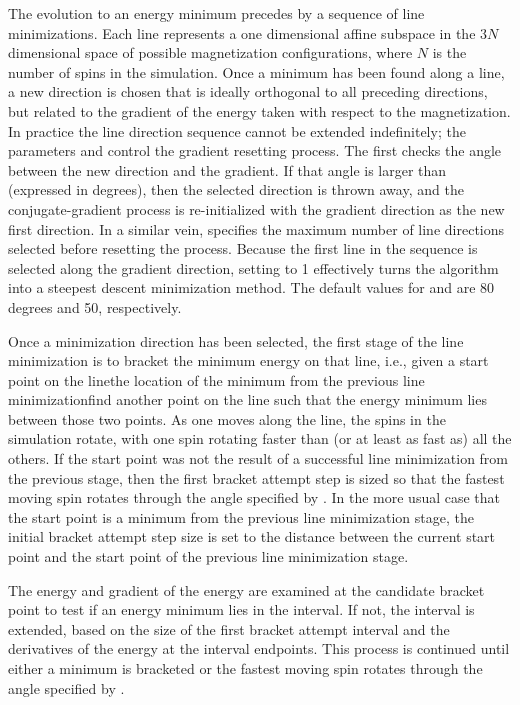 \begin{description}
The evolution to an energy minimum precedes by a sequence of line
minimizations.  Each line represents a one dimensional affine subspace
in the $3N$ dimensional space of possible magnetization configurations,
where $N$ is the number of spins in the simulation.  Once a minimum has
been found along a line, a new direction is chosen that is ideally
orthogonal to all preceding directions, but related to the gradient of
the energy taken with respect to the magnetization.  In practice the
line direction sequence cannot be extended indefinitely; the parameters
 and 
control the gradient resetting process.  The first checks the angle
between the new direction and the gradient.  If that angle is larger
than  (expressed in degrees), then the selected
direction is thrown away, and the conjugate-gradient process is
re-initialized with the gradient direction as the new first direction.
In a similar vein,  specifies the maximum number of line
directions selected before resetting the process.  Because the first
line in the sequence is selected along the gradient direction, setting
 to 1 effectively turns the algorithm into a steepest
descent minimization method.  The default values for
 and  are 80 degrees and 50,
respectively.

Once a minimization direction has been selected, the first stage of the
line minimization is to bracket the minimum energy on that line, i.e.,
given a start point on the line\emdash the location of the minimum from the
previous line minimization\emdash find another point on the line such that
the energy minimum lies between those two points.  As one moves along
the line, the spins in the simulation rotate, with one spin rotating
faster than (or at least as fast as) all the others.  If the start point
was not the result of a successful line minimization from the previous
stage, then the first bracket attempt step is sized so that the fastest
moving spin rotates through the angle specified by
.  In the more usual case that the
start point is a minimum from the previous line minimization stage, the
initial bracket attempt step size is set to the distance between the
current start point and the start point of the previous line
minimization stage.

The energy and gradient of the energy are examined at the candidate
bracket point to test if an energy minimum lies in the interval.  If
not, the interval is extended, based on the size of the first bracket
attempt interval and the derivatives of the energy at the interval
endpoints.  This process is continued until either a minimum is
bracketed or the fastest moving spin rotates through the angle specified
by .


\end{description}
